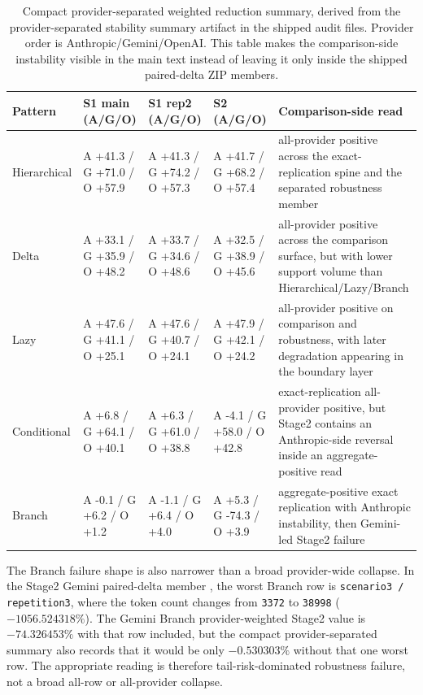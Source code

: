 \documentclass[11pt,a4paper]{article}
\begin{document}
\begin{table}[t]
\centering
\small
\begin{tabular}{L{1.85cm}L{2.7cm}L{2.7cm}L{2.7cm}L{3.75cm}}
\toprule
\textbf{Pattern} & \textbf{S1 main (A/G/O)} & \textbf{S1 rep2 (A/G/O)} & \textbf{S2 (A/G/O)} & \textbf{Comparison-side read} \\
\midrule
Hierarchical & A +41.3 / G +71.0 / O +57.9 & A +41.3 / G +74.2 / O +57.3 & A +41.7 / G +68.2 / O +57.4 & all-provider positive across the exact-replication spine and the separated robustness member \\
Delta & A +33.1 / G +35.9 / O +48.2 & A +33.7 / G +34.6 / O +48.6 & A +32.5 / G +38.9 / O +45.6 & all-provider positive across the comparison surface, but with lower support volume than Hierarchical/Lazy/Branch \\
Lazy & A +47.6 / G +41.1 / O +25.1 & A +47.6 / G +40.7 / O +24.1 & A +47.9 / G +42.1 / O +24.2 & all-provider positive on comparison and robustness, with later degradation appearing in the boundary layer \\
Conditional & A +6.8 / G +64.1 / O +40.1 & A +6.3 / G +61.0 / O +38.8 & A -4.1 / G +58.0 / O +42.8 & exact-replication all-provider positive, but Stage2 contains an Anthropic-side reversal inside an aggregate-positive read \\
Branch & A -0.1 / G +6.2 / O +1.2 & A -1.1 / G +6.4 / O +4.0 & A +5.3 / G -74.3 / O +3.9 & aggregate-positive exact replication with Anthropic instability, then Gemini-led Stage2 failure \\
\bottomrule
\end{tabular}
\caption{Compact provider-separated weighted reduction summary, derived from
the provider-separated stability summary artifact in the shipped audit files.
Provider order is Anthropic/Gemini/OpenAI. This table makes the comparison-side
instability visible in the main text instead of leaving it only inside the
shipped paired-delta ZIP members.}
\label{tab:provider_separated_stability}
\end{table}

The Branch failure shape is also narrower than a broad provider-wide collapse. In the Stage2 Gemini paired-delta member , the worst Branch row is \texttt{scenario3 / repetition3}, where the token count changes from \texttt{3372} to \texttt{38998} (\(-1056.524318\%\)). The Gemini Branch provider-weighted Stage2 value is \(-74.326453\%\) with that row included, but the compact provider-separated summary also records that it would be only \(-0.530303\%\) without that one worst row. The appropriate reading is therefore tail-risk-dominated robustness failure, not a broad all-row or all-provider collapse.
\end{document}

